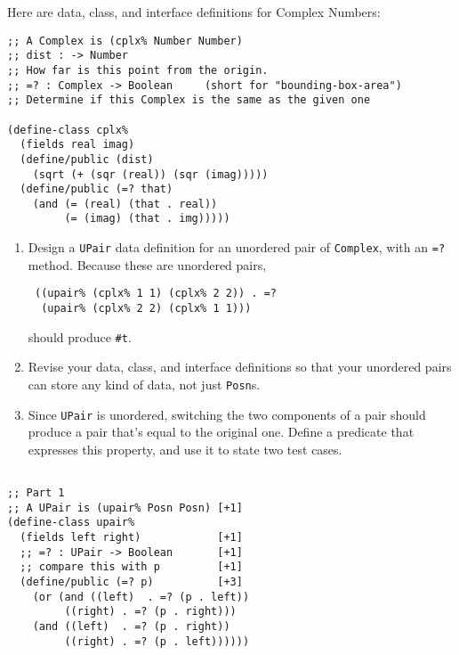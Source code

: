 \documentclass[12pt]{article}                   %
\def\pts#1{\marginpar{\footnotesize \raggedright  \fbox{#1 {\sc Points}}}}
\newenvironment{solution}{}{}
\begin{document}
\begin{problem}\pts{20}

Here are data, class, and interface definitions for Complex Numbers:

\begin{verbatim}
;; A Complex is (cplx% Number Number)
;; dist : -> Number
;; How far is this point from the origin.
;; =? : Complex -> Boolean     (short for "bounding-box-area")
;; Determine if this Complex is the same as the given one

(define-class cplx%
  (fields real imag)
  (define/public (dist)
    (sqrt (+ (sqr (real)) (sqr (imag)))))
  (define/public (=? that) 
    (and (= (real) (that . real))
         (= (imag) (that . img)))))

\end{verbatim}

\begin{enumerate}
\item Design a {\tt UPair} data definition for an unordered pair of
  {\tt Complex}, with an {\tt =?}  method.  Because these are
  unordered pairs, 

\begin{verbatim}
 ((upair% (cplx% 1 1) (cplx% 2 2)) . =?
  (upair% (cplx% 2 2) (cplx% 1 1)))
\end{verbatim}

should produce {\tt \#t}.

\item Revise your data, class, and interface definitions so that your
  unordered pairs can store any kind of data, not just {\tt Posn}s.

\item Since {\tt UPair} is unordered, switching the two components of
  a pair should produce a pair that's equal to the original one.
  Define a predicate that expresses this property, and use it to state
  two test cases.

\end{enumerate}




\begin{solution}
\begin{verbatim} 

;; Part 1
;; A UPair is (upair% Posn Posn) [+1]
(define-class upair%
  (fields left right)            [+1]
  ;; =? : UPair -> Boolean       [+1]
  ;; compare this with p         [+1]
  (define/public (=? p)          [+3]
    (or (and ((left)  . =? (p . left))
	     ((right) . =? (p . right)))
	(and ((left)  . =? (p . right))
	     ((right) . =? (p . left))))))


\end{verbatim}
\end{solution}
\end{problem}
\end{document}
